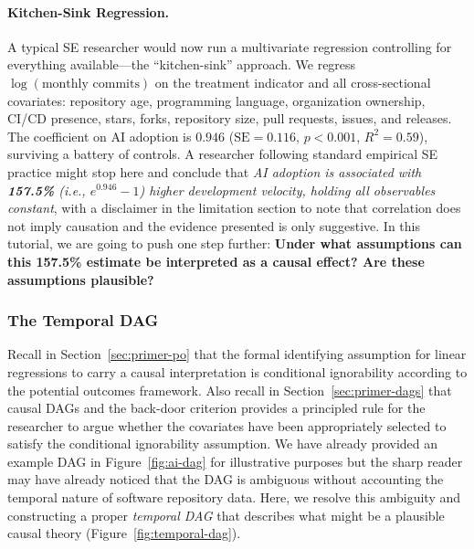 \paragraph{Kitchen-Sink Regression.}
\label{sec:kitchen-sink}

A typical SE researcher would now run a multivariate regression controlling for everything available---the ``kitchen-sink'' approach.
We regress $\log(\text{monthly commits})$ on the treatment indicator and all cross-sectional covariates: repository age, programming language, organization ownership, CI/CD presence, stars, forks, repository size, pull requests, issues, and releases.
The coefficient on AI adoption is $0.946$ ($\text{SE} = 0.116$, $p < 0.001$, $R^2 = 0.59$), surviving a battery of controls.
A researcher following standard empirical SE practice might stop here and conclude that \emph{AI adoption is associated with \textbf{157.5\%} (i.e., $e^{0.946} - 1$) higher development velocity, holding all observables constant}, with a disclaimer in the limitation section to note that correlation does not imply causation and the evidence presented is only suggestive.
In this tutorial, we are going to push one step further: \textbf{Under what assumptions can this 157.5\% estimate be interpreted as a causal effect? Are these assumptions plausible?}

\subsubsection{The Temporal DAG}
\label{sec:temporal-dag}

Recall in Section~\ref{sec:primer-po} that the formal identifying assumption for linear regressions to carry a causal interpretation is conditional ignorability according to the potential outcomes framework.
Also recall in Section~\ref{sec:primer-dags} that causal DAGs and the back-door criterion provides a principled rule for the researcher to argue whether the covariates have been appropriately selected to satisfy the conditional ignorability assumption.
We have already provided an example DAG in Figure~\ref{fig:ai-dag} for illustrative purposes but the sharp reader may have already noticed that the DAG is ambiguous without accounting the temporal nature of software repository data.
Here, we resolve this ambiguity and constructing a proper \emph{temporal DAG} that describes what might be a plausible causal theory (Figure~\ref{fig:temporal-dag}).

